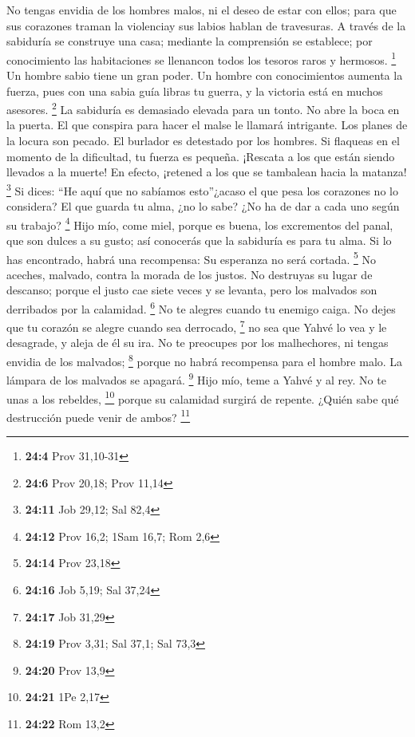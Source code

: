 \begin{paracol}{2}
 No tengas envidia de los hombres malos, ni el deseo de
estar con ellos;  para que sus corazones traman la
violenciay sus labios hablan de travesuras.  A través de
la sabiduría se construye una casa; mediante la comprensión se
establece;  por conocimiento las habitaciones se llenancon
todos los tesoros raros y hermosos. \footnote{\textbf{24:4} Prov
  31,10-31}  Un hombre sabio tiene un gran poder. Un
hombre con conocimientos aumenta la fuerza,  pues con una
sabia guía libras tu guerra, y la victoria está en muchos asesores.
\footnote{\textbf{24:6} Prov 20,18; Prov 11,14}  La
sabiduría es demasiado elevada para un tonto. No abre la boca en la
puerta.  El que conspira para hacer el malse le llamará
intrigante.  Los planes de la locura son pecado. El
burlador es detestado por los hombres.  Si flaqueas en el
momento de la dificultad, tu fuerza es pequeña.  ¡Rescata
a los que están siendo llevados a la muerte! En efecto, ¡retened a los
que se tambalean hacia la matanza! \footnote{\textbf{24:11} Job 29,12;
  Sal 82,4}  Si dices: ``He aquí que no sabíamos
esto''¿acaso el que pesa los corazones no lo considera? El que guarda tu
alma, ¿no lo sabe? ¿No ha de dar a cada uno según su trabajo?
\footnote{\textbf{24:12} Prov 16,2; 1Sam 16,7; Rom 2,6} 
Hijo mío, come miel, porque es buena, los excrementos del panal, que son
dulces a su gusto;  así conocerás que la sabiduría es
para tu alma. Si lo has encontrado, habrá una recompensa: Su esperanza
no será cortada. \footnote{\textbf{24:14} Prov 23,18}  No
aceches, malvado, contra la morada de los justos. No destruyas su lugar
de descanso;  porque el justo cae siete veces y se
levanta, pero los malvados son derribados por la calamidad. \footnote{\textbf{24:16}
  Job 5,19; Sal 37,24}  No te alegres cuando tu enemigo
caiga. No dejes que tu corazón se alegre cuando sea derrocado,
\footnote{\textbf{24:17} Job 31,29}  no sea que Yahvé lo
vea y le desagrade, y aleja de él su ira.  No te
preocupes por los malhechores, ni tengas envidia de los malvados;
\footnote{\textbf{24:19} Prov 3,31; Sal 37,1; Sal 73,3} 
porque no habrá recompensa para el hombre malo. La lámpara de los
malvados se apagará. \footnote{\textbf{24:20} Prov 13,9} 
Hijo mío, teme a Yahvé y al rey. No te unas a los rebeldes, \footnote{\textbf{24:21}
  1Pe 2,17}  porque su calamidad surgirá de repente.
¿Quién sabe qué destrucción puede venir de ambos? \footnote{\textbf{24:22}
  Rom 13,2}


\end{paracol}
